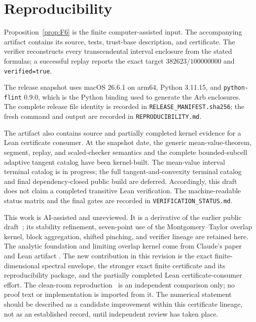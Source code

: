 \documentclass[11pt]{article}
\begin{document}
\clearpage
\section*{Reproducibility}

Proposition~\ref{prop:F6} is the finite computer-assisted input.  The
accompanying artifact contains its source, tests, trust-base description,
and certificate.  The verifier reconstructs every transcendental interval
enclosure from the stated formulas; a successful replay reports the exact
target $382623/100000000$ and \texttt{verified=true}.

The release snapshot uses macOS 26.6.1 on arm64, Python 3.11.15, and
\texttt{python-flint} 0.9.0, which is the Python binding used to generate the
Arb enclosures.  The complete release file identity is recorded in
\texttt{RELEASE\_MANIFEST.sha256}; the fresh command and output are recorded
in \texttt{REPRODUCIBILITY.md}.

The artifact also contains source and partially completed kernel evidence for
a Lean certificate consumer.  At the snapshot date, the generic
mean-value-theorem, segment, replay, and scaled-checker semantics and the
complete bounded-subcell adaptive tangent catalog have been kernel-built.
The mean-value interval terminal catalog is in progress; the full
tangent-and-convexity terminal catalog and final dependency-closed public
build are deferred.
Accordingly, this draft does not claim a completed transitive Lean
verification.  The machine-readable status matrix and the final gates are
recorded in \texttt{VERIFICATION\_STATUS.md}.

This work is AI-assisted and unreviewed.  It is a derivative of the earlier
public draft~\cite{Ainta26}; its stability refinement, seven-point use of the
Montgomery--Taylor overlap kernel, block aggregation, shifted pinching, and
verifier lineage are retained here.  The analytic foundation and limiting
overlap kernel come from Claude's paper and Lean artifact
\cite{Claude26,AnthropicLean26}.  The new contribution in this revision is the
exact finite-dimensional spectral envelope, the stronger exact finite
certificate and its reproducibility package, and the partially completed Lean
certificate-consumer effort.  The clean-room
reproduction~\cite{Learademacher26} is an independent comparison only; no
proof text or implementation is imported from it.
The numerical statement should be described as a candidate improvement within
this certificate lineage, not as an established record, until independent
review has taken place.
\end{document}
